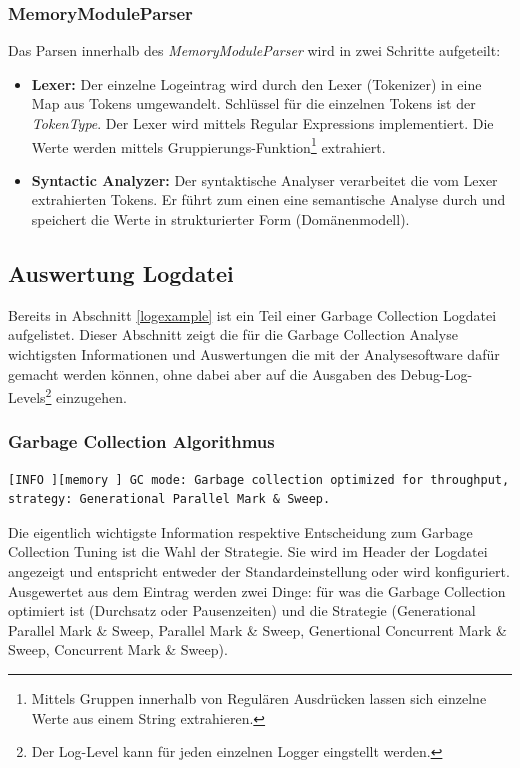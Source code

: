 \subsubsection{MemoryModuleParser}
Das Parsen innerhalb des \textit{MemoryModuleParser} wird in zwei Schritte aufgeteilt:
\begin{itemize}
\item \textbf{Lexer: }Der einzelne Logeintrag wird durch den Lexer (Tokenizer) in eine Map aus Tokens umgewandelt. Schlüssel für die einzelnen Tokens ist der \textit{TokenType}. Der Lexer wird mittels Regular Expressions implementiert. Die Werte werden mittels Gruppierungs-Funktion\footnote{Mittels Gruppen innerhalb von Regulären Ausdrücken lassen sich einzelne Werte aus einem String extrahieren.} extrahiert. 
\item \textbf{Syntactic Analyzer: }Der syntaktische Analyser verarbeitet die vom Lexer extrahierten Tokens. Er führt zum einen eine semantische Analyse durch und speichert die Werte in strukturierter Form (Domänenmodell).
\end{itemize}

\subsection{Auswertung Logdatei}
Bereits in Abschnitt \ref{logexample} ist ein Teil einer Garbage Collection Logdatei aufgelistet. Dieser Abschnitt zeigt die für die Garbage Collection Analyse wichtigsten Informationen und Auswertungen die mit der Analysesoftware dafür gemacht werden können, ohne dabei aber auf die Ausgaben des Debug-Log-Levels\footnote{Der Log-Level kann für jeden einzelnen Logger eingstellt werden.} einzugehen.

\subsubsection{Garbage Collection Algorithmus}
\begin{lstlisting}[numbers=none,  framexleftmargin=0mm, caption=Logdatei: Ausgabe initialer Garbage Collection Algorithmus]
[INFO ][memory ] GC mode: Garbage collection optimized for throughput, strategy: Generational Parallel Mark & Sweep.
\end{lstlisting}
Die eigentlich wichtigste Information respektive Entscheidung zum Garbage Collection Tuning ist die Wahl der Strategie. Sie wird im Header der Logdatei angezeigt und entspricht entweder der Standardeinstellung oder wird konfiguriert. Ausgewertet aus dem Eintrag werden zwei Dinge: für was die Garbage Collection optimiert ist (Durchsatz oder Pausenzeiten) und die Strategie (Generational Parallel Mark \& Sweep, Parallel Mark \& Sweep, Genertional Concurrent Mark \& Sweep, Concurrent Mark \& Sweep).
	
